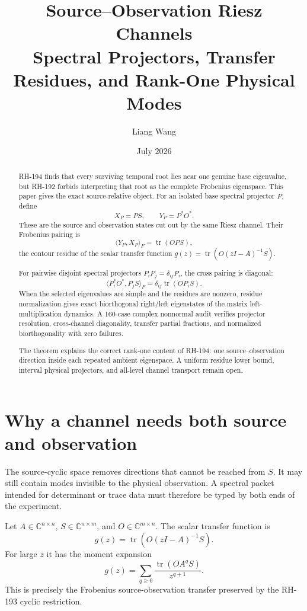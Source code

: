 \documentclass[12pt]{article}
\title{Source--Observation Riesz Channels\\
\large Spectral Projectors, Transfer Residues, and Rank-One Physical Modes}
\author{Liang Wang}
\date{July 2026}
\theoremstyle{remark}
\begin{document}
\maketitle

\begin{abstract}
RH-194 finds that every surviving temporal root lies near one genuine base
eigenvalue, but RH-192 forbids interpreting that root as the complete
Frobenius eigenspace.  This paper gives the exact source-relative object.
For an isolated base spectral projector $P$, define
\[
 X_P=PS,
 \qquad Y_P=P^*O^*.
\]
These are the source and observation states cut out by the same Riesz
channel.  Their Frobenius pairing is
\[
 \langle Y_P,X_P\rangle_F=\operatorname{tr}(OPS),
\]
the contour residue of the scalar transfer function
$g(z)=\operatorname{tr}(O(zI-A)^{-1}S)$.

For pairwise disjoint spectral projectors $P_iP_j=\delta_{ij}P_i$, the cross
pairing is diagonal:
\[
 \langle P_i^*O^*,P_jS\rangle_F
 =\delta_{ij}\operatorname{tr}(OP_iS).
\]
When the selected eigenvalues are simple and the residues are nonzero,
residue normalization gives exact biorthogonal right/left eigenstates of
the matrix left-multiplication dynamics.  A 160-case complex nonnormal audit
verifies projector resolution, cross-channel diagonality, transfer partial
fractions, and normalized biorthogonality with zero failures.

The theorem explains the correct rank-one content of RH-194: one
source--observation direction inside each repeated ambient eigenspace.  A
uniform residue lower bound, interval physical projectors, and all-level
channel transport remain open.
\end{abstract}

\section{Why a channel needs both source and observation}

The source-cyclic space removes directions that cannot be reached from $S$.
It may still contain modes invisible to the physical observation.  A
spectral packet intended for determinant or trace data must therefore be
typed by both ends of the experiment.

Let $A\in\mathbb C^{n\times n}$,
$S\in\mathbb C^{n\times m}$, and
$O\in\mathbb C^{m\times n}$.  The scalar transfer function is
\begin{equation}\label{eq:transfer}
 g(z)=\operatorname{tr}\!\left(O(zI-A)^{-1}S\right).
\end{equation}
For large $z$ it has the moment expansion
\begin{equation}\label{eq:moment-expansion}
 g(z)=\sum_{q\ge0}\frac{\operatorname{tr}(OA^qS)}{z^{q+1}}.
\end{equation}
This is precisely the Frobenius source-observation transfer preserved by the
RH-193 cyclic restriction.
\end{document}
